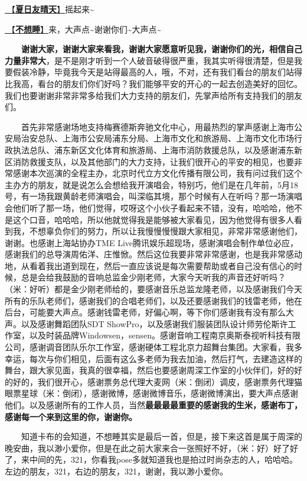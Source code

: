 \documentclass[]{ctexbook}
\begin{document}
\hyperref[sunny-day-in-summer]{🎵【\textbf{夏日友晴天}】}摇起来\textasciitilde{}

\hyperref[donot-want-to-sleep]{🎵【\textbf{不想睡}】}来，大声点\textasciitilde 谢谢你们\textasciitilde 大声点\textasciitilde{}

  \textbf{谢谢大家，谢谢大家来看我，谢谢大家愿意听见我，谢谢你们的光，相信自己力量非常大}，是不是刚才听到一个人破音破得很严重，我其实听得很清楚，但是我要假装冷静，毕竟我今天是站得最高的人，哦，不对，还有我们看台的朋友们站得比我高，看台的朋友们你们好吗？我们能够平安的开心的一起去创造美好的回忆。我们也要谢谢非常非常多给我们大力支持的朋友们，先掌声给所有支持我们的朋友们。

  首先非常感谢场地支持梅赛德斯奔驰文化中心，用最热烈的掌声感谢上海市公安局治安总队、上海市公安局浦东分局、上海市文化和旅游局、上海市文化市场行政执法总队、浦东新区文化体育和旅游局、上海市消防救援总队，以及感谢浦东新区消防救援支队，以及其他部门的大力支持，让我们很开心的平安的相见，也要非常感谢本次巡演的全程主办，北京时代立方文化传播有限公司，我有问过我们这个主办方的朋友，就是说怎么会想给我开演唱会，特别巧，他们是在几年前，5月18号，有一场我跟黄龄老师演唱会，叫深临其境，那个时候有人在听吗？那一场演唱会他们听了那一场，他们觉得，哎呀这个小伙子看起来不错，没有，哈哈哈，他不是这个口音，哈哈哈，所以他就觉得我是能够被大家看见，因为他觉得有很多人看到我，不想辜负你们的努力，所以让我慢慢慢慢跟大家相见，非常非常感谢他们，谢谢。也感谢上海站协办TME Live腾讯娱乐超现场，感谢演唱会制作单位必应，感谢我们的总导演周佑洋、庄惟惞。然后这位我要非常非常感谢，也是我非常感动地，从看着我出道到现在，然后一直应该说是每次需要帮助或者自己没有信心的时候，总是会给我鼓励的音响总监金少刚老师，大家今天听我的声音还好听吗？（米：好听）都是金少刚老师给的，要感谢音乐总监龙隆老师，以及感谢我们今天所有的乐队老师们，感谢我们的合唱老师们，以及还要感谢我们的钱雷老师，他在后台，可能要大声点。感谢钱雷老师，好偏心啊，等下你们感谢我有没有那么大声。以及感谢舞蹈团队SDT ShowPro，以及感谢我们服装团队设计师劳伦斯许工作室，以及时装品牌Windowsen，sensen。感谢音响工程南京奥斯泰视听科技有限公司，感谢调音团队乐尔工作室，感谢硬体工程北京力超舞台集团。大家看，我多幸运，每次与你们相见，后面有这么多老师为我去加油，然后打气，去建造这样的舞台，跟大家见面，我真的很幸福，然后也要感谢周深工作室的小伙伴们，好的好的好的，我们很开心，感谢票务总代理大麦网（米：倒闭）调皮，感谢票务代理猫眼票星球（米：倒闭），感谢微博，感谢微博音乐，感谢微博演出，要大声点感谢他们。以及感谢所有的工作人员，当然\textbf{最最最最重要的感谢我的生米，感谢布丁，感谢每一个来到这里的你，谢谢你。}

  知道卡布的会知道，不想睡其实是最后一首，但是，接下来这首是属于周深的晚安曲，我以渺小爱你，但是在此之前大家来合一张照好不好，（米：好）好了好了，来中间的先，321，你看我pose多就知道我也是拍过时尚杂志的人，哈哈哈。左边的朋友，321，右边的朋友，321，谢谢，我以渺小爱你。
\end{document}
